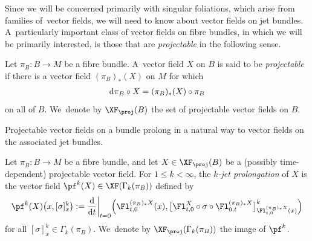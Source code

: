 Since we will be concerned primarily with singular foliations, which arise from families of~vec\-tor fields, we will need to know about vector fields on jet bundles. A~particularly important class of vector fields on fibre bundles, in which we will be primarily interested, is those that are \textit{projectable} in the following sense.

\begin{Definition}%
Let $\pi_{B}\colon B\rightarrow M$ be a fibre bundle. A~vector field $X$ on $B$ is said to be \textit{pro\-jec\-table} if there is a vector field $(\pi_{B})_{*}(X)$ on $M$ for which
\begin{gather}\label{projectableeqn}
{\rm d}\pi_{B}\circ X = (\pi_{B})_{*}(X)\circ \pi_{B}
\end{gather}
on all of $B$. We~denote by $\XF_{\proj}(B)$ the set of projectable vector fields on $B$.
\end{Definition}

Projectable vector fields on a bundle prolong in a natural way to vector fields on the associated jet bundles.

\begin{Definition}
Let $\pi_{B}\colon B\rightarrow M$ be a fibre bundle, and let $X\in\XF_{\proj}(B)$ be a (possibly time-dependent) projectable vector field. For $1\leq k<\infty$, the \textit{$k$-jet prolongation} of $X$ is the vector field $\pf^{k}(X)\in\XF(\Gamma_{k}(\pi_{B}))$ defined by
\begin{gather*}
\pf^{k}(X)\big(x,[\sigma]^{k}_{x}\big):=\frac{\rm d}{{\rm d}t}\bigg|_{t=0}\Big(\Fl^{(\pi_{B})_{*}X}_{t,0}(x),\big[\Fl^{X}_{t,0}\circ \sigma\circ\Fl^{(\pi_{B})_{*}X}_{0,t}\big]^{k}_{\Fl^{(\pi_{B})_{*}X}_{t,0}(x)}\Big)
\end{gather*}
for all $[\sigma]^{k}_{x}\in \Gamma_{k}(\pi_{B})$. We~denote by $\XF_{\proj}(\Gamma_{k}(\pi_{B}))$ the image of $\pf^{k}$.
\end{Definition}

